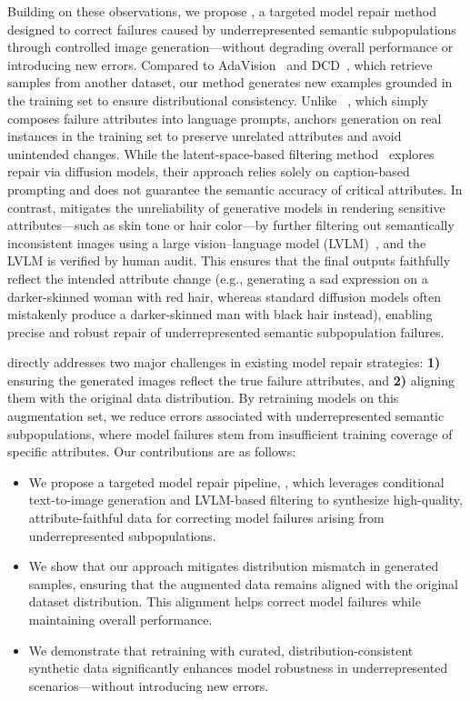Building on these observations, we propose \model, a targeted model repair method designed to correct failures caused by underrepresented semantic subpopulations through controlled image generation—without degrading overall performance or introducing new errors. Compared to AdaVision~\cite{gao2023adaptive} and DCD~\cite{singla2024data}, which retrieve samples from another dataset, our method generates new examples grounded in the training set to ensure distributional consistency. Unlike \hibug~\cite{chen2023hibug}, which simply composes failure attributes into language prompts, \model anchors generation on real instances in the training set to preserve unrelated attributes and avoid unintended changes. While the latent-space-based filtering method~\cite{jain2023latentfailures} explores repair via diffusion models, their approach relies solely on caption-based prompting and does not guarantee the semantic accuracy of critical attributes. In contrast, \model mitigates the unreliability of generative models in rendering sensitive attributes—such as skin tone or hair color—by further filtering out semantically inconsistent images using a large vision--language model (LVLM)~\cite{bai2025qwen25vl, liu2023improvedllava}, and the LVLM is verified by human audit. This ensures that the final outputs faithfully reflect the intended attribute change (e.g., generating a sad expression on a darker-skinned woman with red hair, whereas standard diffusion models often mistakenly produce a darker-skinned man with black hair instead), enabling precise and robust repair of underrepresented semantic subpopulation failures. 


\model directly addresses two major challenges in existing model repair strategies: {\bf 1)} ensuring the generated images reflect the true failure attributes, and {\bf 2)} aligning them with the original data distribution. By retraining models on this augmentation set, we reduce errors associated with underrepresented semantic subpopulations, where model failures stem from insufficient training coverage of specific attributes. Our contributions are as follows:
\begin{itemize}
\item We propose a targeted model repair pipeline, \model, which leverages conditional text-to-image generation and LVLM-based filtering to synthesize high-quality, attribute-faithful data for correcting model failures arising from underrepresented subpopulations.

\item We show that our approach mitigates distribution mismatch in generated samples, ensuring that the augmented data remains aligned with the original dataset distribution. This alignment helps correct model failures while maintaining overall performance.
\item We demonstrate that retraining with curated, distribution-consistent synthetic data significantly enhances model robustness in underrepresented scenarios—without introducing new errors.

\end{itemize}